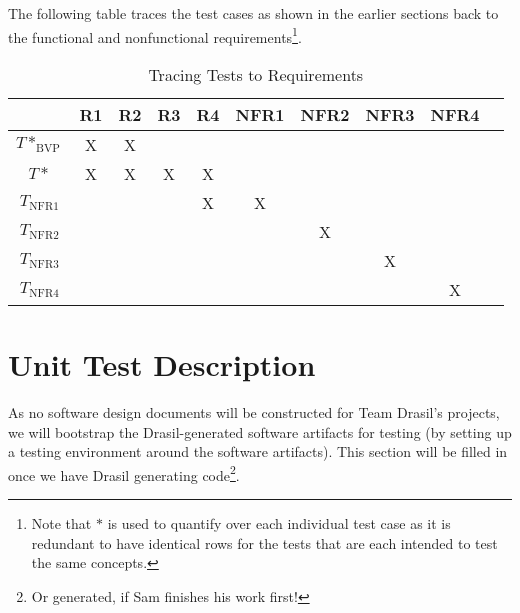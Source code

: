 \documentclass[12pt, titlepage]{article}
\begin{document}
The following table traces the test cases as shown in the earlier sections back
to the functional and nonfunctional requirements\footnote{Note that $*$ is used
to quantify over each individual test case as it is redundant to have identical
rows for the tests that are each intended to test the same concepts.}.

\begin{longtable}{|c|c|c|c|c|c|c|c|c|c|}
    \caption{Tracing Tests to Requirements}
    \label{tab:trace_tests_to_reqs} \\
    
    \hline

                    & R1 & R2 & R3 & R4 & NFR1 & NFR2 & NFR3 & NFR4 \\ \hline
    $T*_\text{BVP}$ & X  & X  &    &    &      &      &      &      \\ \hline
    $T*$            & X  & X  & X  & X  &      &      &      &      \\ \hline
    $T_\text{NFR1}$ &    &    &    & X  & X    &      &      &      \\ \hline
    $T_\text{NFR2}$ &    &    &    &    &      & X    &      &      \\ \hline
    $T_\text{NFR3}$ &    &    &    &    &      &      & X    &      \\ \hline
    $T_\text{NFR4}$ &    &    &    &    &      &      &      & X    \\ \hline

\end{longtable}

\newpage{}

\section{Unit Test Description}
\label{sec:unit_test_description}

As no software design documents will be constructed for Team Drasil's projects,
we will bootstrap the Drasil-generated software artifacts for testing (by
setting up a testing environment around the software artifacts). This section
will be filled in once we have Drasil generating code\footnote{Or generated, if
Sam finishes his work first!}.

\end{document}
